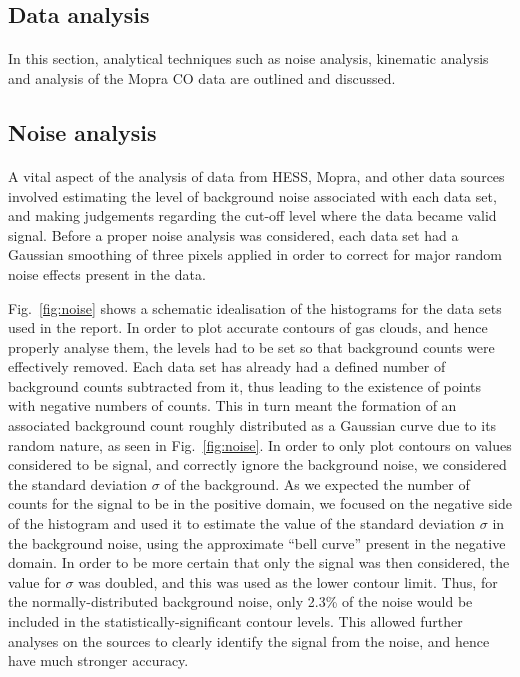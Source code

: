 \documentclass[a4paper, titlepage, oneside]{article}
\begin{document}
\begin{multicols}{2}
\section{Data analysis} %
\paragraph{}
In this section, analytical techniques such as noise analysis, kinematic analysis and analysis of the Mopra CO data are outlined and discussed.

\subsection{Noise analysis}
\paragraph{}
A vital aspect of the analysis of data from HESS, Mopra, and other data sources involved estimating the level of background noise associated with each data set, and making judgements regarding the cut-off level where the data became valid signal. Before a proper noise analysis was considered, each data set had a Gaussian smoothing of three pixels applied in order to correct for major random noise effects present in the data.

Fig.~\ref{fig:noise} shows a schematic idealisation of the histograms for the data sets used in the report. In order to plot accurate contours of gas clouds, and hence properly analyse them, the levels had to be set so that background counts were effectively removed. Each data set has already had a defined number of background counts subtracted from it, thus leading to the existence of points with negative numbers of counts. This in turn meant the formation of an associated background count roughly distributed as a Gaussian curve due to its random nature, as seen in Fig.~\ref{fig:noise}. In order to only plot contours on values considered to be signal, and correctly ignore the background noise, we considered the standard deviation \(\sigma\) of the background. As we expected the number of counts for the signal to be in the positive domain, we focused on the negative side of the histogram and used it to estimate the value of the standard deviation \(\sigma\) in the background noise, using the approximate ``bell curve'' present in the negative domain. In order to be more certain that only the signal was then considered, the value for \(\sigma\) was doubled, and this was used as the lower contour limit. Thus, for the normally-distributed background noise, only 2.3\% of the noise would be included in the statistically-significant contour levels. This allowed further analyses on the sources to clearly identify the signal from the noise, and hence have much stronger accuracy.


\end{multicols}
\end{document}
